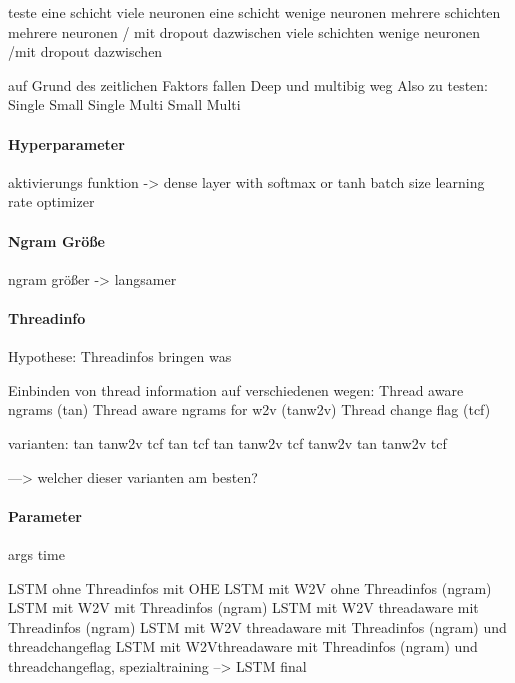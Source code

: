             teste eine schicht viele neuronen 
            eine schicht wenige neuronen
            mehrere schichten mehrere neuronen / mit dropout dazwischen
            viele schichten wenige neuronen /mit dropout dazwischen

            auf Grund des zeitlichen Faktors fallen Deep und multibig weg
            Also zu testen:
            Single Small
            Single 
            Multi Small
            Multi 

        \paragraph{Hyperparameter}
            aktivierungs funktion
            -> dense layer with softmax or tanh
            batch size
            learning rate
            optimizer

        \paragraph{Ngram Größe}
            ngram größer -> langsamer

        \paragraph{Threadinfo}
            Hypothese:
            Threadinfos bringen was

            Einbinden von thread information auf verschiedenen wegen:
            Thread aware ngrams (tan)
            Thread aware ngrams for w2v (tanw2v)
            Thread change flag (tcf)

            varianten:
            tan
            tanw2v
            tcf
            tan tcf
            tan tanw2v
            tcf tanw2v
            tan tanw2v tcf

            ---> welcher dieser varianten am besten?

        \paragraph{Parameter}
            args
            time

            \ac{LSTM} ohne Threadinfos mit OHE
            LSTM mit W2V ohne Threadinfos (ngram)
            LSTM mit W2V mit Threadinfos (ngram)
            LSTM mit W2V threadaware mit Threadinfos (ngram)
            LSTM mit W2V threadaware mit Threadinfos (ngram) und threadchangeflag
            LSTM mit W2Vthreadaware mit Threadinfos (ngram) und threadchangeflag, spezialtraining
            --> LSTM final

